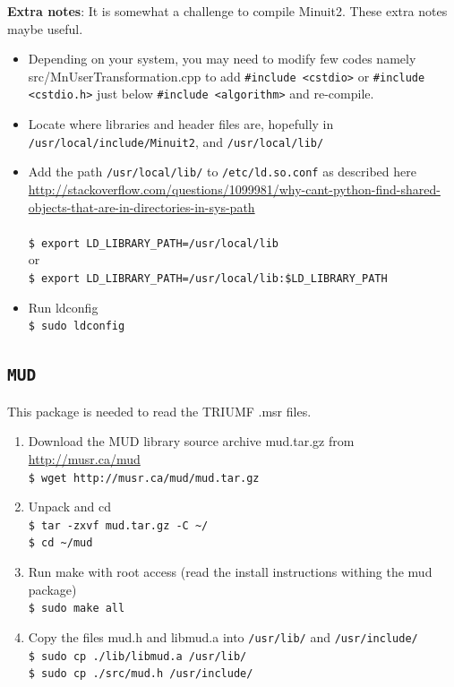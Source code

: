 \documentclass[10pt,letterpaper,oneside]{article}
\newcommand{\mud}{\texttt{MUD}}
\begin{document}
{\bf Extra notes}: It is somewhat a challenge to compile Minuit2. These extra notes maybe useful.
\begin{itemize}
 \item Depending on your system, you may need to modify few codes namely  src/MnUserTransformation.cpp to add  \verb+#include <cstdio>+ or  \verb+#include <cstdio.h>+ just below  \verb+#include <algorithm>+ and re-compile.

 \item Locate where libraries and header files are, hopefully in  
 \verb+/usr/local/include/Minuit2+, and \verb+/usr/local/lib/+

 \item Add the path \verb+/usr/local/lib/+ to \verb+/etc/ld.so.conf+ as described here
 \url{http://stackoverflow.com/questions/1099981/why-cant-python-find-shared-objects-that-are-in-directories-in-sys-path}\\
 \\ \verb+$ export LD_LIBRARY_PATH=/usr/local/lib+ \\ or
 \\ \verb+$ export LD_LIBRARY_PATH=/usr/local/lib:$LD_LIBRARY_PATH+

 \item Run ldconfig
 \\ \verb+$ sudo ldconfig+
\end{itemize}


\subsection{\mud}
This package is needed to read the TRIUMF .msr files.
\begin{enumerate}
 \item  Download the MUD library source archive mud.tar.gz from \url{http://musr.ca/mud}
 \\ \verb+$ wget http://musr.ca/mud/mud.tar.gz+

 \item  Unpack and cd
 \\ \verb+$ tar -zxvf mud.tar.gz -C ~/+
 \\ \verb+$ cd ~/mud+

 \item  Run make with root access (read the install instructions withing the mud package)
 \\ \verb+$ sudo make all+

 \item  Copy the files mud.h and libmud.a into \verb+/usr/lib/+ and 
 \verb+/usr/include/+
 \\ \verb+$ sudo cp ./lib/libmud.a /usr/lib/+
 \\ \verb+$ sudo cp ./src/mud.h /usr/include/+
\end{enumerate}
\end{document}
